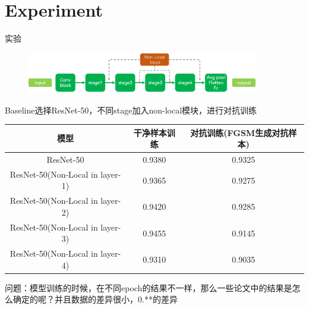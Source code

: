 \section{Experiment}

\begin{frame}{实验}
    \begin{scriptsize}
        \begin{figure}
            \centering
            \includegraphics[width=0.9\textwidth]{docs/0903/images/resnet-nonlocal.png}
        \end{figure}
        Baseline选择ResNet-50，不同stage加入non-local模块，进行对抗训练
        \begin{table}
            \begin{tabular}{ccc}
                \hline
                模型 & 干净样本训练 & 对抗训练(FGSM生成对抗样本) \\  
                \hline          
                ResNet-50                       & 0.9380 & 0.9325 \\
                ResNet-50(Non-Local in layer-1) & 0.9365 & 0.9275 \\
                ResNet-50(Non-Local in layer-2) & 0.9420 & 0.9285 \\
                ResNet-50(Non-Local in layer-3) & 0.9455 & 0.9145 \\
                ResNet-50(Non-Local in layer-4) & 0.9310 & 0.9035 \\
                \hline          
            \end{tabular}
        \end{table}
        
        问题：模型训练的时候，在不同epoch的结果不一样，那么一些论文中的结果是怎么确定的呢？并且数据的差异很小，0.**的差异
    \end{scriptsize}    
\end{frame}

